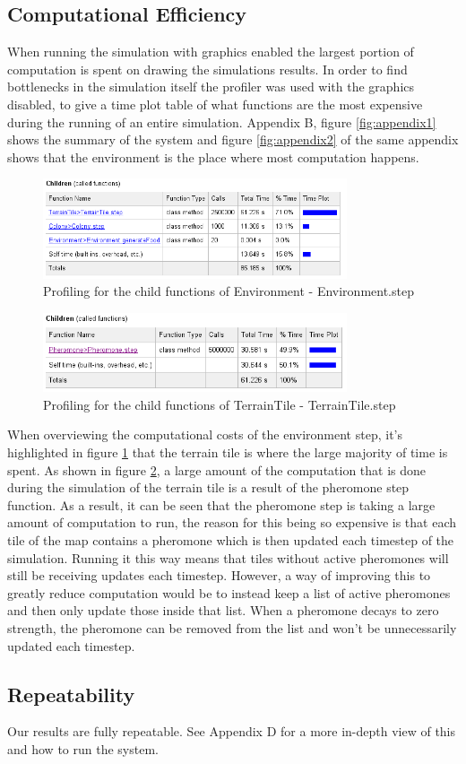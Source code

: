 \subsection{Computational Efficiency}

When running the simulation with graphics enabled the largest portion of computation is spent on drawing the simulations results. In order to find bottlenecks in the simulation itself the profiler was used with the graphics disabled, to give a time plot table of what functions are the most expensive during the running of an entire simulation. Appendix B, figure \ref{fig:appendix1} shows the summary of the system and figure \ref{fig:appendix2} of the same appendix shows that the environment is the place where most computation happens.\par

 \begin{figure}[htb]
  \centering
  \includegraphics[width=0.8\textwidth]{images/text1.png}
  \caption{Profiling for the child functions of Environment - Environment.step}
  \label{fig:text1}
\end{figure}

 \begin{figure}[htb]
  \centering
  \includegraphics[width=0.8\textwidth]{images/text2.png}
  \caption{Profiling for the child functions of TerrainTile - TerrainTile.step}
  \label{fig:text2}
\end{figure}

When overviewing the computational costs of the environment step, it's highlighted in figure \ref{fig:text1} that the terrain tile is where the large majority of time is spent. As shown in figure \ref{fig:text2}, a large amount of the computation that is done during the simulation of the terrain tile is a result of the pheromone step function. As a result, it can be seen that the pheromone step is taking a large amount of computation to run, the reason for this being so expensive is that each tile of the map contains a pheromone which is then updated each timestep of the simulation. Running it this way means that tiles without active pheromones will still be receiving updates each timestep. However, a way of improving this to greatly reduce computation would be to instead keep a list of active pheromones and then only update those inside that list. When a pheromone decays to zero strength, the pheromone can be removed from the list and won't be unnecessarily updated each timestep.\par

\subsection{Repeatability}
Our results are fully repeatable. See Appendix D for a more in-depth view of this and how to run the system.\par
